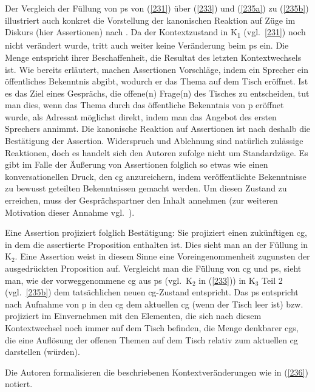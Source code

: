 Der Vergleich der Füllung von ps von (\ref{231}) über (\ref{233}) und (\ref{235a}) zu (\ref{235b}) illustriert auch konkret die Vorstellung der kanonischen Reaktion auf Züge im Diskurs (hier Assertionen) nach \citet{Farkas2010}. Da der Kontextzustand in K\textsubscript{1} (vgl.\ \ref{231}) noch nicht verändert wurde, tritt auch weiter keine Veränderung beim ps ein. Die Menge entspricht ihrer Beschaffenheit, die Resultat des letzten Kontextwechsels ist. Wie bereits erläutert, machen Assertionen Vorschläge, indem ein Sprecher ein öffentliches Bekenntnis abgibt, wodurch er das Thema auf dem Tisch eröffnet. Ist es das Ziel eines Gesprächs, die offene(n) Frage(n) des Tisches zu entscheiden, tut man dies, wenn das Thema durch das öffentliche Bekenntnis von p eröffnet wurde, als Adressat möglichst direkt, indem man das Angebot des ersten Sprechers annimmt. Die kanonische Reaktion auf Assertionen ist nach \citet{Farkas2010} deshalb die Bestätigung der Assertion. Widerspruch und Ablehnung sind natürlich zulässige Reaktionen, doch es handelt sich den Autoren zufolge nicht um Standardzüge. Es gibt im Falle der Äußerung von Assertionen folglich so etwas wie einen konversationellen Druck, den cg anzureichern, indem veröffentlichte Bekenntnisse zu bewusst geteilten Bekenntnissen gemacht werden. Um diesen Zustand zu erreichen, muss der Gesprächspartner den Inhalt annehmen (zur weiteren Motivation dieser Annahme vgl.\ \citealt[85]{Farkas2010}). 

Eine Assertion projiziert folglich Bestätigung: Sie projiziert einen zukünftigen cg, in dem die assertierte Proposition enthalten ist. Dies sieht man an der Füllung in $\textrm{K}_{2}$. Eine Assertion weist in diesem Sinne eine Voreingenommenheit zugunsten der ausgedrückten Proposition auf. Vergleicht man die Füllung von cg und ps, sieht man, wie der vorweggenommene cg aus ps (vgl.\ $\textrm{K}_{2}$ in (\ref{233})) in $\textrm{K}_{3}$ Teil 2 (vgl.\ \ref{235b}) dem tatsächlichen neuen cg-Zustand entspricht. Das ps entspricht nach Aufnahme von p in den cg dem aktuellen cg (wenn der Tisch leer ist) bzw. projiziert im Einvernehmen mit den Elementen, die sich nach diesem Kontext\-wechsel noch immer auf dem Tisch befinden, die Menge denkbarer cgs, die eine Auflösung der offenen Themen auf dem Tisch relativ zum aktuellen cg darstellen (würden).

Die Autoren formalisieren die beschriebenen Kontextveränderungen wie in (\ref{236}) notiert. 


